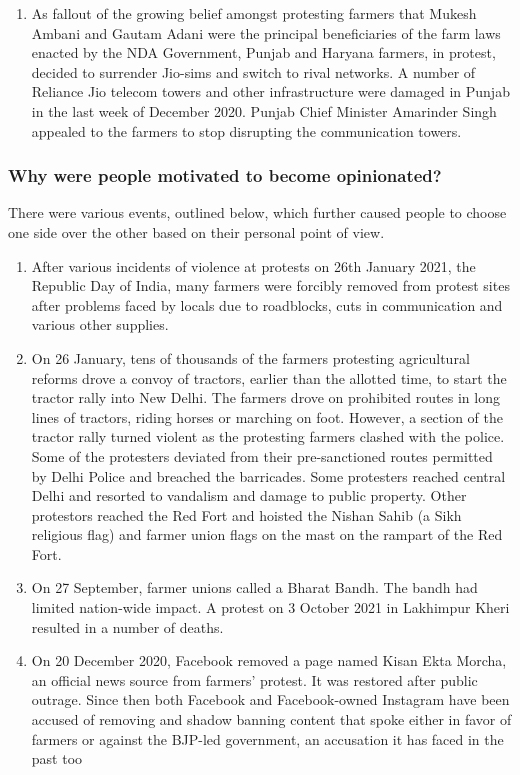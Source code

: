 \documentclass{article}
\begin{document}
\begin{enumerate}
    \item As fallout of the growing belief amongst protesting farmers that Mukesh Ambani and Gautam Adani were the principal beneficiaries of the farm laws enacted by the NDA Government, Punjab and Haryana farmers, in protest, decided to surrender Jio-sims and switch to rival networks. A number of Reliance Jio telecom towers and other infrastructure were damaged in Punjab in the last week of December 2020. Punjab Chief Minister Amarinder Singh appealed to the farmers to stop disrupting the communication towers.
\end{enumerate}
\subsubsection{Why were people motivated to become opinionated?}
There were various events, outlined below, which further caused people to choose one side over the other based on their personal point of view.
\begin{enumerate}
    \item After various incidents of violence at protests on 26th January 2021, the Republic Day of India, many farmers were forcibly removed from protest sites after problems faced by locals due to roadblocks, cuts in communication and various other supplies.
    \item On 26 January, tens of thousands of the farmers protesting agricultural reforms drove a convoy of tractors, earlier than the allotted time, to start the tractor rally into New Delhi. The farmers drove on prohibited routes in long lines of tractors, riding horses or marching on foot. However, a section of the tractor rally turned violent as the protesting farmers clashed with the police. Some of the protesters deviated from their pre-sanctioned routes permitted by Delhi Police and breached the barricades. Some protesters reached central Delhi and resorted to vandalism and damage to public property. Other protestors reached the Red Fort and hoisted the Nishan Sahib (a Sikh religious flag) and farmer union flags on the mast on the rampart of the Red Fort.
    \item On 27 September, farmer unions called a Bharat Bandh. The bandh had limited nation-wide impact. A protest on 3 October 2021 in Lakhimpur Kheri resulted in a number of deaths.
    \item On 20 December 2020, Facebook removed a page named Kisan Ekta Morcha, an official news source from farmers' protest. It was restored after public outrage. Since then both Facebook and Facebook-owned Instagram have been accused of removing and shadow banning content that spoke either in favor of farmers or against the BJP-led government, an accusation it has faced in the past too

\end{enumerate}
\end{document}
